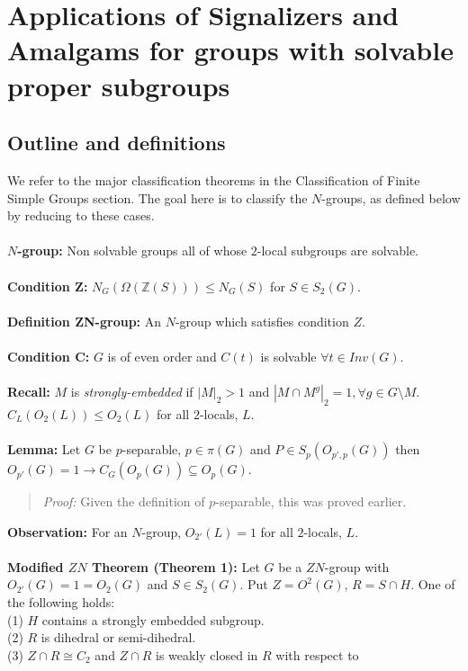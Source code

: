 \chapter{Applications of Signalizers and Amalgams for groups with solvable proper subgroups}
\section {Outline and definitions}
We refer to the major classification theorems in the Classiﬁcation of Finite Simple Groups section.  The
goal here is to classify the $N$-groups, as defined below by reducing to these cases.
\\
\\
{\bf $N$-group:}  Non solvable groups all of whose $2$-local subgroups are solvable.
\\
\\
{\bf Condition Z:}  $N_G(\Omega({\mathbb Z}(S))) \le N_G(S)$ for $S \in S_2(G)$.
\\
\\
{\bf Definition ZN-group:} An $N$-group which satisfies condition $Z$.
\\
\\
{\bf Condition {\cal C}:}  $G$ is of even order and $C(t)$ is solvable $\forall t \in Inv(G)$.
\\
\\
{\bf Recall:}  $M$ is \emph{strongly-embedded} if
$|M|_2 > 1$ and $|M \cap M^g|_2=1, \forall g \in G \setminus M$.  $C_L(O_2(L)) \le O_2(L)$ for all
$2$-locals, $L$.
\\
\\
{\bf Lemma:} Let $G$ be $p$-separable, $p \in \pi(G)$ and $P \in S_p(O_{p', p}(G))$ then
$O_{p'}(G)=1 \rightarrow C_G(O_p(G)) \subseteq O_p(G)$.
\begin{quote}
\emph{Proof:}
Given the definition of $p$-separable, this was proved earlier.
\end{quote}
{\bf Observation:} For an $N$-group, $O_{2'}(L)=1$ for all $2$-locals, $L$.
\\
\\
{\bf Modified $ZN$ Theorem (Theorem 1):}  Let $G$ be a $ZN$-group
with $O_{2'}(G)=1=O_2(G)$ and $S \in S_2(G)$.  Put
$Z= O^2(G)$, $R= S \cap H$.  One of the following holds:\\
(1) $H$ contains a strongly embedded subgroup.\\
(2) $R$ is dihedral or semi-dihedral.\\
(3) $Z \cap R \cong C_2$ and $Z \cap R$ is weakly closed in $R$ with respect to 

